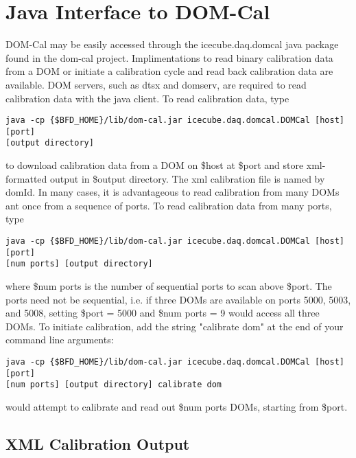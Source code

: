 \documentclass[10pt]{article}
\begin{document}
\section{Java Interface to DOM-Cal}

DOM-Cal may be easily accessed through the icecube.daq.domcal java package found
in the dom-cal project.  Implimentations to read binary calibration data from a DOM
or initiate a calibration cycle and read back calibration data are available.  DOM
servers, such as dtsx and domserv, are required to read calibration data with the
java client.  To read calibration data, type
\begin{verbatim}
java -cp {$BFD_HOME}/lib/dom-cal.jar icecube.daq.domcal.DOMCal [host] [port]
[output directory]
\end{verbatim}
to download calibration data from a DOM on \$host at \$port and store xml-formatted
output in \$output directory.  The xml calibration file is named by domId.  In many
cases, it is advantageous to read calibration from many DOMs ant once from a sequence
of ports.  To read calibration data from many ports, type
\begin{verbatim}
java -cp {$BFD_HOME}/lib/dom-cal.jar icecube.daq.domcal.DOMCal [host] [port]
[num ports] [output directory]
\end{verbatim}
where \$num ports is the number of sequential ports to scan above \$port.  The ports
need not be sequential, i.e. if three DOMs are available on ports 5000, 5003, and 5008,
setting \$port = 5000 and \$num ports = 9 would access all three DOMs.  To initiate
calibration, add the string "calibrate dom" at the end of your command line arguments:
\begin{verbatim}
java -cp {$BFD_HOME}/lib/dom-cal.jar icecube.daq.domcal.DOMCal [host] [port]
[num ports] [output directory] calibrate dom
\end{verbatim}
would attempt to calibrate and read out \$num ports DOMs, starting from \$port.

\subsection{XML Calibration Output}
\end{document}
